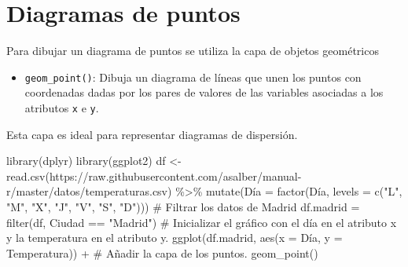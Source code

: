 \documentclass[
  a4paper,
]{scrreport}
\newenvironment{Shaded}{\begin{snugshade}}{\end{snugshade}}
\newcommand{\AttributeTok}[1]{\textcolor[rgb]{0.40,0.45,0.13}{#1}}
\newcommand{\CommentTok}[1]{\textcolor[rgb]{0.37,0.37,0.37}{#1}}
\newcommand{\FunctionTok}[1]{\textcolor[rgb]{0.28,0.35,0.67}{#1}}
\newcommand{\NormalTok}[1]{\textcolor[rgb]{0.00,0.23,0.31}{#1}}
\newcommand{\OtherTok}[1]{\textcolor[rgb]{0.00,0.23,0.31}{#1}}
\newcommand{\SpecialCharTok}[1]{\textcolor[rgb]{0.37,0.37,0.37}{#1}}
\newcommand{\StringTok}[1]{\textcolor[rgb]{0.13,0.47,0.30}{#1}}
\providecommand{\tightlist}{%
  \setlength{\itemsep}{0pt}\setlength{\parskip}{0pt}}\usepackage{longtable,booktabs,array}
\theoremstyle{definition}
\theoremstyle{definition}
\theoremstyle{remark}
\begin{document}
\hypertarget{diagramas-de-puntos}{%
\section{Diagramas de puntos}\label{diagramas-de-puntos}}

Para dibujar un diagrama de puntos se utiliza la capa de objetos
geométricos

\begin{itemize}
\tightlist
\item
  \texttt{geom\_point()}: Dibuja un diagrama de líneas que unen los
  puntos con coordenadas dadas por los pares de valores de las variables
  asociadas a los atributos \texttt{x} e \texttt{y}.
\end{itemize}

Esta capa es ideal para representar diagramas de dispersión.

\begin{Shaded}
\begin{Highlighting}[]
\FunctionTok{library}\NormalTok{(dplyr)}
\FunctionTok{library}\NormalTok{(ggplot2)}
\NormalTok{df }\OtherTok{\textless{}{-}} \FunctionTok{read.csv}\NormalTok{(}\StringTok{\textquotesingle{}https://raw.githubusercontent.com/asalber/manual{-}r/master/datos/temperaturas.csv\textquotesingle{}}\NormalTok{) }\SpecialCharTok{\%\textgreater{}\%}
    \FunctionTok{mutate}\NormalTok{(Día }\OtherTok{=} \FunctionTok{factor}\NormalTok{(Día, }\AttributeTok{levels =} \FunctionTok{c}\NormalTok{(}\StringTok{"L"}\NormalTok{, }\StringTok{"M"}\NormalTok{, }\StringTok{"X"}\NormalTok{, }\StringTok{"J"}\NormalTok{, }\StringTok{"V"}\NormalTok{, }\StringTok{"S"}\NormalTok{, }\StringTok{"D"}\NormalTok{)))}
\CommentTok{\# Filtrar los datos de Madrid}
\NormalTok{df.madrid }\OtherTok{=} \FunctionTok{filter}\NormalTok{(df, Ciudad }\SpecialCharTok{==} \StringTok{"Madrid"}\NormalTok{)}
\CommentTok{\# Inicializar el gráfico con el día en el atributo x y la temperatura en el atributo y.}
\FunctionTok{ggplot}\NormalTok{(df.madrid, }\FunctionTok{aes}\NormalTok{(}\AttributeTok{x =}\NormalTok{ Día, }\AttributeTok{y =}\NormalTok{ Temperatura)) }\SpecialCharTok{+}
\CommentTok{\# Añadir la capa de los puntos.}
    \FunctionTok{geom\_point}\NormalTok{()}
\end{Highlighting}
\end{Shaded}
\end{document}
